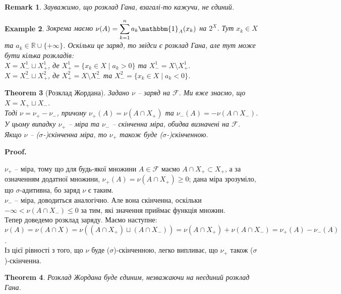 \documentclass[a4paper, 10pt]{article}
\makeatletter
\theoremstyle{theoremdd}
\newtheorem{theorem}{Theorem}[subsection]
\newtheorem{example}[theorem]{Example}
\newtheorem{remark}[theorem]{Remark}
\renewenvironment{proof}[1][Proof.\\]{\par
\pushQED{\hfill \qed}%
\normalfont \topsep6\p@\@plus6\p@\relax
\trivlist
\item\relax
{\bfseries
#1\@addpunct{.}}\hspace\labelsep\ignorespaces
}{%
\popQED\endtrivlist\@endpefalse
}
\makeatother
\begin{document}
\begin{remark}
Зауважимо, що розклад Гана, взагалі-то кажучи, не єдиний.
\end{remark}

\begin{example}
Зокрема маємо $\nu(A) = \displaystyle\sum_{k=1}^n a_k \mathbbm{1}_{A}(x_k)$ на $2^X$. Тут $x_k \in X$ та $a_k \in \mathbb{R} \cup \{+\infty\}$. Оскільки це заряд, то звідси є розклад Гана, але тут може бути кілька розкладів:\\
$X = X^1_- \sqcup X^1_+$, де $X^1_+ = \{x_k \in X \mid a_k > 0\}$ та $X^1_- = X \setminus X^1_+$.\\
$X = X^2_- \sqcup X^2_+$, де $X^2_+ = X \setminus X^2_-$ та $X^2_- = \{x_k \in X \mid a_k < 0\}$.
\end{example}

\begin{theorem}[Розклад Жордана]
Задано $\nu$ -- заряд на $\mathcal{F}$. Ми вже знаємо, що $X = X_+ \sqcup X_-$.\\ 
Тоді $\nu = \nu_+ - \nu_-$, причому $\nu_+(A) = \nu(A \cap X_+)$ та $\nu_-(A) = -\nu(A \cap X_-)$. У цьому випадку $\nu_+$ -- міра та $\nu_-$ -- скінченна міра, обидва визначені на $\mathcal{F}$.\\
Якщо $\nu$ -- ($\sigma$-)скінченна міра, то $\nu_+$ також буде ($\sigma$-)скінченною.
\end{theorem}

\begin{proof}
$\nu_+$ -- міра, тому що для будь-якої множини $A \in \mathcal{F}$ маємо $A \cap X_+ \subset X_+$, а за означенням додатної множини, $\nu_+(A) = \nu(A \cap X_+) \geq 0$; дана міра зрозуміло, що $\sigma$-адитивна, бо заряд $\nu$ є таким.\\
$\nu_-$ -- міра, доводиться аналогічно. Але вона скінченна, оскільки $-\infty < \nu(A \cap X_-) \leq 0$ за тим, які значення приймає функція множин.\\
Тепер доведемо розклад заряду. Маємо наступне:\\
$\nu(A) = \nu(A \cap X) = \nu((A \cap X_+) \sqcup (A \cap X_-)) = \nu(A \cap X_+) + \nu(A \cap X_-) = \nu_+(A) - \nu_-(A)$.\\
Із цієї рівності з того, що $\nu$ буде ($\sigma$)-скінченною, легко випливає, що $\nu_+$ також ($\sigma$)-скінченна.
\end{proof}

\begin{theorem}
Розклад Жордана буде єдиним, незважаючи на неєдиний розклад Гана.
\end{theorem}
\end{document}
